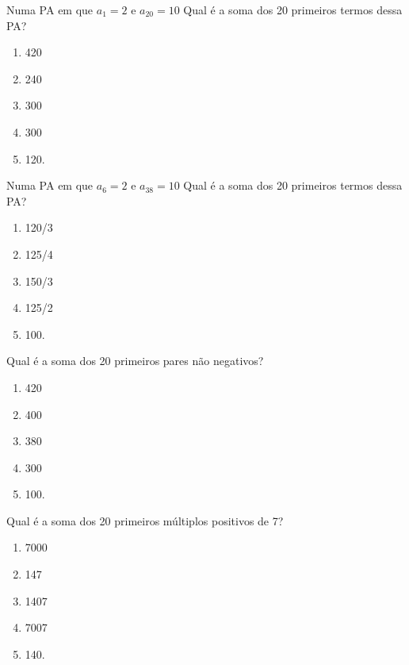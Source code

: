 		\item Numa PA em que $a_{1} = 2$ e $a_{20} = 10$ Qual é a soma dos 20 primeiros termos dessa PA?
		\begin{multicols}{5}
		\begin{enumerate}
			\item 420
			\item 240
			\item 300 
			\item 300 
			\item 120.
		\end{enumerate} 
		\end{multicols}

		\item Numa PA em que $a_{6} = 2$ e $a_{38} = 10$ Qual é a soma dos 20 primeiros termos dessa PA?
		\begin{multicols}{5}
		\begin{enumerate}
			\item 120/3
			\item 125/4
			\item 150/3 
			\item 125/2 
			\item 100.
		\end{enumerate} 
		\end{multicols}

		\item Qual é a soma dos 20 primeiros pares não negativos?
		\begin{multicols}{5}
		\begin{enumerate}
			\item 420
			\item 400
			\item 380 
			\item 300 
			\item 100.
		\end{enumerate} 
		\end{multicols}

		\item Qual é a soma dos 20 primeiros múltiplos positivos de 7?
		\begin{multicols}{5}
		\begin{enumerate}
			\item 7000
			\item 147
			\item 1407 
			\item 7007 
			\item 140.
		\end{enumerate} 
		\end{multicols}
		
